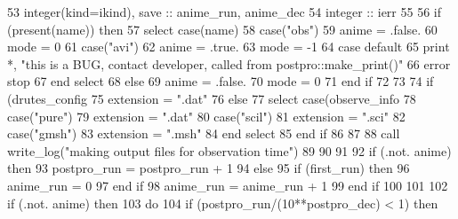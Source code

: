 \begin{DoxyCode}
53       \textcolor{keywordtype}{integer(kind=ikind)}, \textcolor{keywordtype}{save}                             :: anime\_run\textcolor{comment}{, anime\_dec}
54 \textcolor{comment}{      }\textcolor{keywordtype}{integer}                                               :: ierr
55 
56       \textcolor{keywordflow}{if} (\textcolor{keyword}{present}(name)) \textcolor{keywordflow}{then}
57         \textcolor{keywordflow}{select case}(name)
58           \textcolor{keywordflow}{case}(\textcolor{stringliteral}{"obs"})
59             anime = .false.
60             mode = 0
61           \textcolor{keywordflow}{case}(\textcolor{stringliteral}{"avi"})
62             anime = .true.
63             mode = -1
64 \textcolor{keywordflow}{          case default}
65             print *, \textcolor{stringliteral}{"this is a BUG, contact developer, called from postpro::make\_print()"}
66             error stop
67 \textcolor{keywordflow}{        end select}
68       \textcolor{keywordflow}{else}
69         anime = .false.
70         mode = 0
71 \textcolor{keywordflow}{      end if}
72       
73 
74       \textcolor{keywordflow}{if} (drutes_config%
75         extension = \textcolor{stringliteral}{".dat"}
76       \textcolor{keywordflow}{else} 
77         \textcolor{keywordflow}{select case}(observe_info%
78           \textcolor{keywordflow}{case}(\textcolor{stringliteral}{"pure"})
79             extension = \textcolor{stringliteral}{".dat"}
80           \textcolor{keywordflow}{case}(\textcolor{stringliteral}{"scil"})
81             extension = \textcolor{stringliteral}{".sci"}
82           \textcolor{keywordflow}{case}(\textcolor{stringliteral}{"gmsh"})
83             extension = \textcolor{stringliteral}{".msh"}
84 \textcolor{keywordflow}{        end select}
85 \textcolor{keywordflow}{      end if}
86           
87   
88       \textcolor{keyword}{call }write_log(\textcolor{stringliteral}{"making output files for observation time"})
89       
90 
91       
92       \textcolor{keywordflow}{if} (.not. anime) \textcolor{keywordflow}{then}
93         postpro_run = postpro_run + 1
94       \textcolor{keywordflow}{else}
95         \textcolor{keywordflow}{if} (first\_run) \textcolor{keywordflow}{then}
96           anime\_run = 0
97 \textcolor{keywordflow}{        end if}
98         anime\_run = anime\_run + 1
99 \textcolor{keywordflow}{      end if}
100 
101       
102       \textcolor{keywordflow}{if} (.not. anime) \textcolor{keywordflow}{then}
103         \textcolor{keywordflow}{do} 
104           \textcolor{keywordflow}{if} (postpro_run/(10**postpro_dec) < 1) \textcolor{keywordflow}{then}

\end{DoxyCode}

